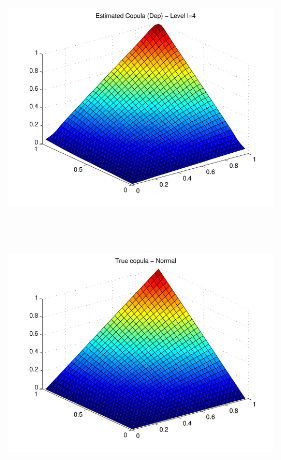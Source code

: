 \documentclass[11pt]{article}
\begin{document}
\begin{enumerate}
\begin{figure}[H]
    \begin{subfigure}
    \centering
    \includegraphics[width=7cm, height=6cm]{Figura3-1.png}
    \end{subfigure}
    \begin{subfigure}
    \centering
    \includegraphics[width=7cm, height=6cm]{Figura4-1.png}
    \end{subfigure}


    \label{fig:copulagraph}
\end{figure}



\end{enumerate}
\end{document}
